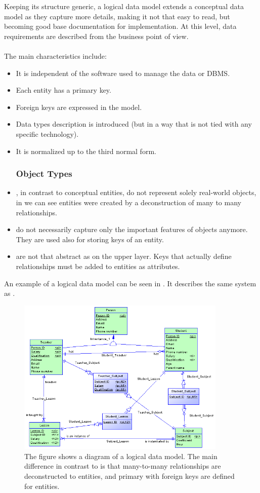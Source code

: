 Keeping its structure generic, a logical data model extends a conceptual data model as they capture more details, making it not that easy to read, but becoming good base documentation for implementation. At this level, data requirements are described from the business point of view. \\ \\
The main characteristics include: 
\begin{itemize}
	\item It is independent of the software used to manage the data or DBMS.
	\item Each entity has a primary key.
	\item Foreign keys are expressed in the model.
	\item Data types description is introduced (but in a way that is not tied with any specific technology).
	\item It is normalized up to the third normal form.
	\subsubsection{Object Types}
	\item {}, in contrast to conceptual entities, do not represent solely real-world objects, in  we can see entities were created by a deconstruction of many to many relationships.
	\item {} do not necessarily capture only the important features of objects anymore. They are used also for storing keys of an entity.
	\item {} are not that abstract as on the upper layer. Keys that actually define relationships must be added to entities as attributes.
\end{itemize}

An example of a logical data model can be seen in . It describes the same system as .

\begin{figure}[H]
	\centering
	\includegraphics[width=10cm]{../img/Logical_Model_PowerDesigner}
	\caption[Logical diagram \cite{PowerDesignerDocumentation}]{The figure shows a diagram of a logical data model. The main difference in contrast to  is that many-to-many relationships are deconstructed to entities, and primary with foreign keys are defined for entities.}
	\label{LDM}
\end{figure}

